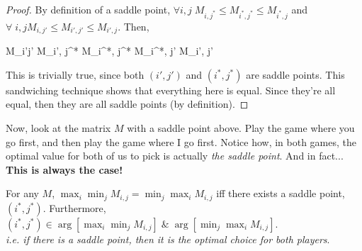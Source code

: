 \begin{proof}
By definition of a saddle point, 
$\forall i,j \; M_{i,j^*} \leq M_{i^*,j^*} \leq M_{i^*, j}$ and
$\forall \; i,j M_{i,j'} \leq M_{i',j'} \leq M_{i', j}$.
Then, 
\begin{frml}
	M_{i'j'} \leq M_{i', j^*} \leq M_{i^*, j^*} \leq M_{i^*, j'} \leq M_{i', j'}
\end{frml}
This is trivially true, since both $(i', j')$ and $(i^*, j^*)$ are saddle 
points. This sandwiching technique shows that everything here is equal. Since
they're all equal, then they are all saddle points (by definition).
\end{proof}

Now, look at the matrix $M$ with a saddle point above. Play the game
where you go first, and then play the game where I go first. Notice how, in both
games, the optimal value for both of us to pick is actually \textit{the saddle
point}. And in fact... \textbf{This is always the case!}

\begin{theo}{}{}
For any $M$, $\max_i \min_j M_{i,j} = \min_j \max_i M_{i,j}$
iff there exists a saddle point, $(i^*, j^*)$.  Furthermore, $(i^*, j^*) \in
\arg [\max_i \min_j M_{i,j}] \; \& \; \arg [ \min_j  \max_i M_{i,j}]$.
\medskip\\
\textit{i.e. if there is a saddle point, then it is the optimal choice for both
players}.
\end{theo}

